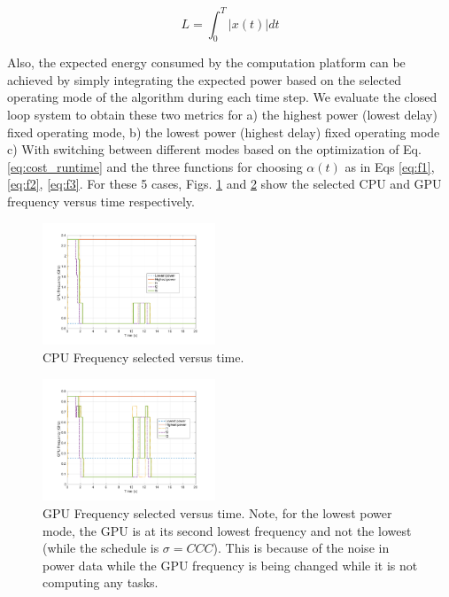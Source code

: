 \begin{equation}
L = \int_0^T |x(t)|dt
\label{eq:ControlPerf}
\end{equation}

Also, the expected energy consumed by the computation platform can be achieved by simply integrating the expected power based on the selected operating mode of the algorithm during each time step. We evaluate the closed loop system to obtain these two metrics for a) the highest power (lowest delay) fixed operating mode, b) the lowest power (highest delay) fixed operating mode c) With switching between different modes based on the optimization of Eq.\ref{eq:cost_runtime} and the three functions for choosing $\alpha(t)$ as in Eqs \ref{eq:f1}, \ref{eq:f2}, \ref{eq:f3}. For these 5 cases, Figs. \ref{fig:cpuf} and \ref{fig:gpuf} show the selected CPU and GPU frequency versus time respectively.  
\begin{figure}[hbtp]
\centering
\includegraphics[width=0.46\textwidth]{../simulations/figs/CPUF.pdf}
\caption{CPU Frequency selected versus time.}
\label{fig:cpuf} 
\end{figure}


\begin{figure}[hbtp]
\centering
\includegraphics[width=0.46\textwidth]{../simulations/figs/GPUF.pdf}
\caption{GPU Frequency selected versus time. Note, for the lowest power mode, the GPU is at its second lowest frequency and not the lowest (while the schedule is $\sigma=CCC$). This is because of the noise in power data while the GPU frequency is being changed while it is not computing any tasks.}
\label{fig:gpuf} 
\end{figure}

